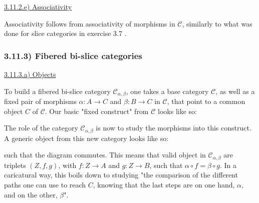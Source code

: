 \documentclass[12pt, letterpaper, twoside]{report}
\begin{document}
\vspace{5mm}
\underline{3.11.2.e) Associativity}

Associativity follows from associativity of morphisms in $\mathcal{C}$, similarly to what was done for slice categories in exercise 3.7 .



\subsubsection*{3.11.3) Fibered bi-slice categories}

\vspace{5mm}
\underline{3.11.3.a) Objects}

To build a fibered bi-slice category $\mathcal{C}_{\alpha, \beta}$, one takes a base category $\mathcal{C}$, as well as a fixed pair of morphisms $\alpha : A \to C$ and $\beta : B \to C$ in $\mathcal{C}$, that point to a common object $C$ of $\mathcal{C}$. Our basic "fixed construct" from $\mathcal{C}$ looks like so: 


The role of the category $\mathcal{C}_{\alpha, \beta}$ is now to study the morphisms into this construct. A generic object from this new category looks like so:


such that the diagram commutes. This means that valid object in $\mathcal{C}_{\alpha, \beta}$ are triplets $(Z, f, g)$, with $f : Z \to A$ and $g : Z \to B$, such that $\alpha \circ f = \beta \circ g$. In a caricatural way, this boils down to studying "the comparison of the different paths one can use to reach $C$, knowing that the last steps are on one hand, $\alpha$, and on the other, $\beta$".
\end{document}
